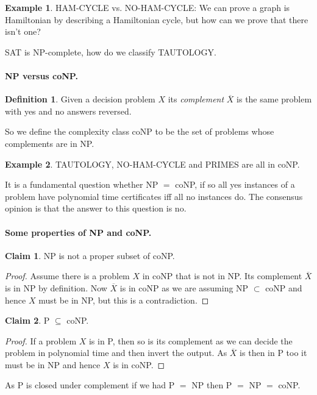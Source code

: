 \documentclass[11pt,a4paper]{article}
\theoremstyle{definition}
\newtheorem{claim}{Claim}
\newtheorem{defn}{Definition}
\newtheorem*{ex}{Example}
\begin{document}
\begin{ex}
HAM-CYCLE vs. NO-HAM-CYCLE: We can prove a graph is Hamiltonian by describing a Hamiltonian cycle, but how can we prove that there isn't one?
\end{ex}

SAT is NP-complete, how do we classify TAUTOLOGY.

\paragraph{NP versus coNP.}
\begin{defn}
Given a decision problem $X$ its \emph{complement} $\overline{X}$ is the same problem with yes and no answers reversed.
\end{defn}

So we define the complexity class coNP to be the set of problems whose complements are in NP.
\begin{ex}
TAUTOLOGY, NO-HAM-CYCLE and PRIMES are all in coNP.
\end{ex}

It is a fundamental question whether NP $=$ coNP, if so all yes instances of a problem have polynomial time certificates iff all no instances do.
The consensus opinion is that the answer to this question is no.

\paragraph{Some properties of NP and coNP.}
\begin{claim}
NP is not a proper subset of coNP.
\end{claim}
\begin{proof}
Assume there is a problem $X$ in coNP that is not in NP.
Its complement $\overline{X}$ is in NP by definition.
Now $\overline{X}$ is in coNP as we are assuming NP $\subset$ coNP and hence $X$ must be in NP, but this is a contradiction.
\end{proof}

\begin{claim}
P $\subseteq$ coNP.
\end{claim}
\begin{proof}
If a problem $X$ is in P, then so is its complement as we can decide the problem in polynomial time and then invert the output.
As $\overline X$ is then in P too it must be in NP and hence $X$ is in coNP.
\end{proof}

As P is closed under complement if we had P $=$ NP then P $=$ NP $=$ coNP.
\end{document}
